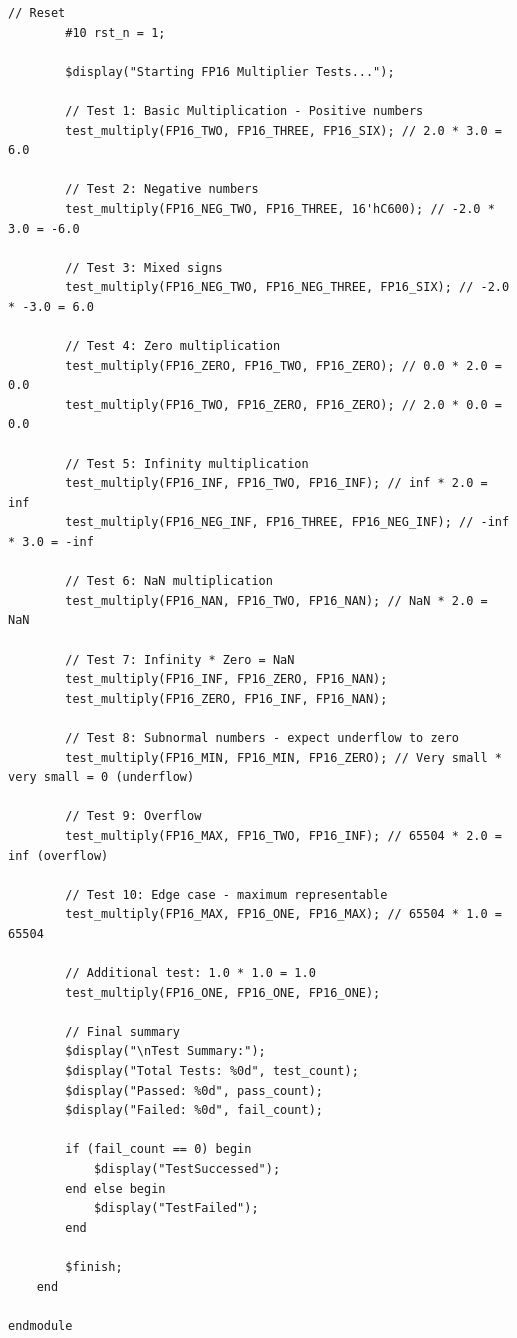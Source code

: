 \documentclass[UTF8]{ctexart}
\begin{document}
\begin{lstlisting}[frame=shadowbox,caption=vRTL251119114743\_749.v]
        // Reset
        #10 rst_n = 1;
        
        $display("Starting FP16 Multiplier Tests...");
        
        // Test 1: Basic Multiplication - Positive numbers
        test_multiply(FP16_TWO, FP16_THREE, FP16_SIX); // 2.0 * 3.0 = 6.0
        
        // Test 2: Negative numbers  
        test_multiply(FP16_NEG_TWO, FP16_THREE, 16'hC600); // -2.0 * 3.0 = -6.0
        
        // Test 3: Mixed signs
        test_multiply(FP16_NEG_TWO, FP16_NEG_THREE, FP16_SIX); // -2.0 * -3.0 = 6.0
        
        // Test 4: Zero multiplication
        test_multiply(FP16_ZERO, FP16_TWO, FP16_ZERO); // 0.0 * 2.0 = 0.0
        test_multiply(FP16_TWO, FP16_ZERO, FP16_ZERO); // 2.0 * 0.0 = 0.0
        
        // Test 5: Infinity multiplication
        test_multiply(FP16_INF, FP16_TWO, FP16_INF); // inf * 2.0 = inf
        test_multiply(FP16_NEG_INF, FP16_THREE, FP16_NEG_INF); // -inf * 3.0 = -inf
        
        // Test 6: NaN multiplication
        test_multiply(FP16_NAN, FP16_TWO, FP16_NAN); // NaN * 2.0 = NaN
        
        // Test 7: Infinity * Zero = NaN
        test_multiply(FP16_INF, FP16_ZERO, FP16_NAN);
        test_multiply(FP16_ZERO, FP16_INF, FP16_NAN);
        
        // Test 8: Subnormal numbers - expect underflow to zero
        test_multiply(FP16_MIN, FP16_MIN, FP16_ZERO); // Very small * very small = 0 (underflow)
        
        // Test 9: Overflow
        test_multiply(FP16_MAX, FP16_TWO, FP16_INF); // 65504 * 2.0 = inf (overflow)
        
        // Test 10: Edge case - maximum representable
        test_multiply(FP16_MAX, FP16_ONE, FP16_MAX); // 65504 * 1.0 = 65504
        
        // Additional test: 1.0 * 1.0 = 1.0
        test_multiply(FP16_ONE, FP16_ONE, FP16_ONE);
        
        // Final summary
        $display("\nTest Summary:");
        $display("Total Tests: %0d", test_count);
        $display("Passed: %0d", pass_count);
        $display("Failed: %0d", fail_count);
        
        if (fail_count == 0) begin
            $display("TestSuccessed");
        end else begin
            $display("TestFailed");
        end
        
        $finish;
    end

endmodule
\end{lstlisting}
\end{document}
